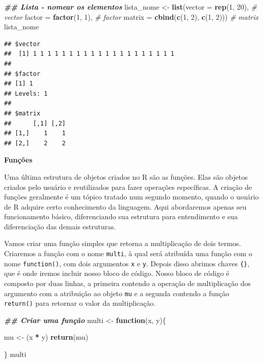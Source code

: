 \documentclass[
]{article}
\newenvironment{Shaded}{\begin{snugshade}}{\end{snugshade}}
\newcommand{\AttributeTok}[1]{\textcolor[rgb]{0.13,0.29,0.53}{#1}}
\newcommand{\CommentTok}[1]{\textcolor[rgb]{0.56,0.35,0.01}{\textit{#1}}}
\newcommand{\ControlFlowTok}[1]{\textcolor[rgb]{0.13,0.29,0.53}{\textbf{#1}}}
\newcommand{\DecValTok}[1]{\textcolor[rgb]{0.00,0.00,0.81}{#1}}
\newcommand{\DocumentationTok}[1]{\textcolor[rgb]{0.56,0.35,0.01}{\textbf{\textit{#1}}}}
\newcommand{\FunctionTok}[1]{\textcolor[rgb]{0.13,0.29,0.53}{\textbf{#1}}}
\newcommand{\NormalTok}[1]{#1}
\newcommand{\OtherTok}[1]{\textcolor[rgb]{0.56,0.35,0.01}{#1}}
\newcommand{\SpecialCharTok}[1]{\textcolor[rgb]{0.81,0.36,0.00}{\textbf{#1}}}
\begin{document}
\begin{Shaded}
\begin{Highlighting}[]
\DocumentationTok{\#\# Lista {-} nomear os elementos}
\NormalTok{lista\_nome }\OtherTok{\textless{}{-}} \FunctionTok{list}\NormalTok{(}\AttributeTok{vector =} \FunctionTok{rep}\NormalTok{(}\DecValTok{1}\NormalTok{, }\DecValTok{20}\NormalTok{), }\CommentTok{\# vector}
              \AttributeTok{factor =} \FunctionTok{factor}\NormalTok{(}\DecValTok{1}\NormalTok{, }\DecValTok{1}\NormalTok{), }\CommentTok{\# factor}
              \AttributeTok{matrix =} \FunctionTok{cbind}\NormalTok{(}\FunctionTok{c}\NormalTok{(}\DecValTok{1}\NormalTok{, }\DecValTok{2}\NormalTok{), }\FunctionTok{c}\NormalTok{(}\DecValTok{1}\NormalTok{, }\DecValTok{2}\NormalTok{))) }\CommentTok{\# matrix}
\NormalTok{lista\_nome}
\end{Highlighting}
\end{Shaded}

\begin{verbatim}
## $vector
##  [1] 1 1 1 1 1 1 1 1 1 1 1 1 1 1 1 1 1 1 1 1
## 
## $factor
## [1] 1
## Levels: 1
## 
## $matrix
##      [,1] [,2]
## [1,]    1    1
## [2,]    2    2
\end{verbatim}

\textbf{Funções}

Uma última estrutura de objetos criados no R são as funções. Elas são objetos criados pelo usuário e reutilizados para fazer operações específicas. A criação de funções geralmente é um tópico tratado num segundo momento, quando o usuário de R adquire certo conhecimento da linguagem. Aqui abordaremos apenas seu funcionamento básico, diferenciando sua estrutura para entendimento e sua diferenciação das demais estruturas.

Vamos criar uma função simples que retorna a multiplicação de dois termos. Criaremos a função com o nome \texttt{multi}, à qual será atribuída uma função com o nome \texttt{function()}, com dois argumentos \texttt{x} e \texttt{y}. Depois disso abrimos chaves \texttt{\{\}}, que é onde iremos incluir nosso bloco de código. Nosso bloco de código é composto por duas linhas, a primeira contendo a operação de multiplicação dos argumento com a atribuição ao objeto \texttt{mu} e a segunda contendo a função \texttt{return()} para retornar o valor da multiplicação.

\begin{Shaded}
\begin{Highlighting}[]
\DocumentationTok{\#\# Criar uma função}
\NormalTok{multi }\OtherTok{\textless{}{-}} \ControlFlowTok{function}\NormalTok{(x, y)\{}
  
\NormalTok{  mu }\OtherTok{\textless{}{-}}\NormalTok{ (x }\SpecialCharTok{*}\NormalTok{ y)}
  \FunctionTok{return}\NormalTok{(mu)}
 
\NormalTok{\}}
\NormalTok{multi}
\end{Highlighting}
\end{Shaded}
\end{document}
